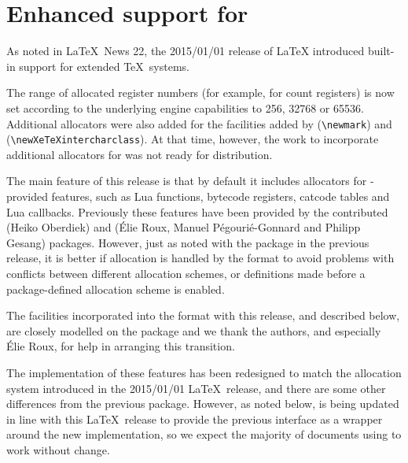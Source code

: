 \documentclass{ltnews}
\begin{document}
\maketitle

\tableofcontents

\section{Enhanced support for }

As noted in \LaTeX\ News 22, the 2015/01/01 release of \LaTeX{}
introduced built-in support for extended \TeX\ systems.

The range of allocated register numbers (for example, for count
registers) is now set according to the underlying engine capabilities
to 256, 32768 or 65536. Additional allocators were also added for the
facilities added by  (\verb|\newmark|) and 
(\verb|\newXeTeXintercharclass|). At that time, however, the work to
incorporate additional allocators for  was not ready for
distribution.

The main feature of this release is  that by default it includes
allocators for -provided features, such as Lua
functions, bytecode registers, catcode tables and Lua callbacks.
Previously these features have been provided by the contributed
 (Heiko Oberdiek) and 
(\'{E}lie Roux,
  Manuel P\'{e}gouri\'{e}-Gonnard and Philipp Gesang)
packages. However, just as
noted with the  package in the previous release, it is
better if allocation is handled by the format to avoid problems with
conflicts between different allocation schemes, or definitions made
before a package-defined allocation scheme is enabled.

The facilities incorporated into the format with this release, and
described below, are closely modelled on the 
package and we thank the authors, and especially \'{E}lie Roux, for
help in arranging this transition.

The implementation of these  features has been
redesigned to match the allocation system introduced in the 2015/01/01
\LaTeX\ release, and there are some other differences from the previous
 package. However, as noted below,
 is being updated in line with this \LaTeX\ release
to provide the previous interface as a wrapper around the new
implementation, so we expect the majority of documents using
 to work without change.
\end{document}
